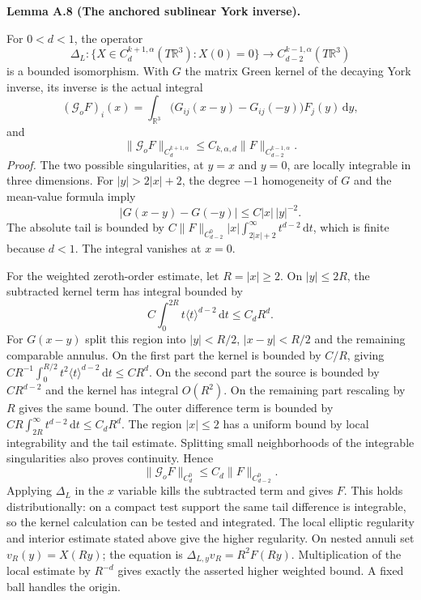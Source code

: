 \documentclass[
  english,
  11pt,
  reqno]{amsart}
\makeatletter
\newcommand{\pandocstatementheading}[1]{%
  \par\if@nobreak\else
    \addpenalty{\@beginparpenalty}%
    \addvspace{.5\baselineskip plus .2\baselineskip minus .2\baselineskip}%
  \fi
  {\normalfont\bfseries #1\par}%
  \nobreak\@afterindenttrue\@afterheading
}
\makeatother
\begin{document}
\pandocstatementheading{\leavevmode{}\label{lem:online-gauge-anchored-york-inverse}Lemma A.8 (The anchored sublinear York inverse).}

For \(0<d<1\), the operator%
 \[
\Delta_L:
\{X\in C^{k+1,\alpha}_d(T\mathbb R^3):X(0)=0\}
\longrightarrow C^{k-1,\alpha}_{d-2}(T\mathbb R^3)
\] is a bounded isomorphism. With \(G\) the matrix Green kernel of the
decaying York inverse, its inverse is the actual integral%
 \[
(\mathcal G_oF)_i(x)
=\int_{\mathbb R^3}
\bigl(G_{ij}(x-y)-G_{ij}(-y)\bigr)F_j(y)\,\mathrm dy,
\] and%
 \[
\|\mathcal G_oF\|_{C^{k+1,\alpha}_d}
\le C_{k,\alpha,d}\|F\|_{C^{k-1,\alpha}_{d-2}}.
\] \emph{Proof.} The two possible singularities, at \(y=x\) and \(y=0\),
are locally integrable in three dimensions. For \(|y|>2|x|+2\), the
degree \(-1\) homogeneity of \(G\) and the mean-value formula imply \[
|G(x-y)-G(-y)|\le C|x|\,|y|^{-2}.
\] The absolute tail is bounded by
\(C\|F\|_{C^0_{d-2}}|x|\int_{2|x|+2}^{\infty}t^{d-2}\,\mathrm dt\),
which is finite because \(d<1\). The integral vanishes at \(x=0\).

For the weighted zeroth-order estimate, let \(R=|x|\ge2\). On
\(|y|\le2R\), the subtracted kernel term has integral bounded by \[
C\int_0^{2R}t\langle t\rangle^{d-2}\,\mathrm dt
\le C_dR^d.
\] For \(G(x-y)\) split this region into \(|y|<R/2\), \(|x-y|<R/2\) and
the remaining comparable annulus. On the first part the kernel is
bounded by \(C/R\), giving
\(CR^{-1}\int_0^{R/2}t^2\langle t\rangle^{d-2}\,\mathrm dt\le CR^d\). On
the second part the source is bounded by \(CR^{d-2}\) and the kernel has
integral \(O(R^2)\). On the remaining part rescaling by \(R\) gives the
same bound. The outer difference term is bounded by
\(CR\int_{2R}^{\infty}t^{d-2}\,\mathrm dt\le C_dR^d\). The region
\(|x|\le2\) has a uniform bound by local integrability and the tail
estimate. Splitting small neighborhoods of the integrable singularities
also proves continuity. Hence \[
\|\mathcal G_oF\|_{C^0_d}\le C_d\|F\|_{C^0_{d-2}}.
\] Applying \(\Delta_L\) in the \(x\) variable kills the subtracted term
and gives \(F\). This holds distributionally: on a compact test support
the same tail difference is integrable, so the kernel calculation can be
tested and integrated. The local elliptic regularity and interior
estimate stated above give the higher regularity. On nested annuli set
\(v_R(y)=X(Ry)\); the equation is \(\Delta_{L,y}v_R=R^2F(Ry)\).
Multiplication of the local estimate by \(R^{-d}\) gives exactly the
asserted higher weighted bound. A fixed ball handles the origin.
\end{document}
